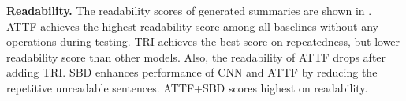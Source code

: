 	




\textbf{Readability.}
The readability scores of generated summaries are 
shown in .
ATTF achieves the
highest readability score among all baselines without 
any operations during testing.
TRI achieves the best score on repeatedness, 
but lower readability score than other models.
Also, the readability of ATTF drops after adding TRI.
SBD enhances performance of CNN and ATTF by reducing the repetitive unreadable sentences. 
ATTF+SBD scores highest on readability.

